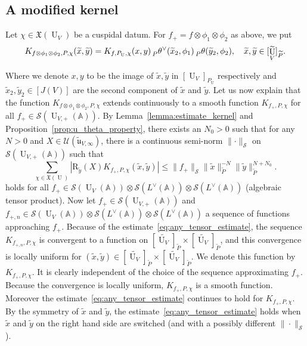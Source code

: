 \documentclass[letterpaper,11pt]{amsart}
\newcommand{\fu}{\mathfrak{u}}
\newcommand{\fX}{\mathfrak{X}}
\newcommand{\bA}{\mathbb{A}}
\newcommand{\cS}{\mathcal{S}}
\newcommand{\cU}{\mathcal{U}}
\newcommand{\<}{\negthickspace}
\providecommand{\aabs}[1]{\lVert#1\rVert}
\providecommand{\Abs}[1]{\left\lvert#1\right\rvert}
\DeclareMathOperator{\U}{U}
\theoremstyle{definition}
\theoremstyle{plain}
\theoremstyle{remark}
\numberwithin{equation}{section}
\begin{document}
\subsection{A modified kernel}

\label{subsec:u_main_thm_spectral}

Let $\chi \in \fX(\U_V)$ be a cuspidal datum. For $f_+=f \otimes
\phi_1 \otimes \phi_2$ as above, we put
\begin{equation}
\label{eq:unitary_kernel_defi}
      K_{f \otimes \phi_1 \otimes \phi_2, P, \chi}
    (\widetilde{x}, \widetilde{y})
    = K_{f, P_{\U}, \chi}(x, y)
    \prescript{}{P}{\theta}^\vee(\widetilde{x}_2, \phi_1)
    \prescript{}{P}{\theta}(\widetilde{y}_2, \phi_2),
    \quad \widetilde{x},\widetilde{y} \in [\widetilde{\U_V}]_{\widetilde{P}}.
\end{equation}

Where we denote $x,y$ to be the image of $\widetilde{x},\widetilde{y}$ in $[\U_V]_{P_{\U}}$ respectively and $\widetilde{x}_2,\widetilde{y}_2 \in [J(V)]$ are the second component of $\widetilde{x}$ and $\widetilde{y}$.
Let us now explain that the function $K_{f \otimes \phi_1 \otimes
\phi_2, P, \chi}$ extends continuously to a smooth function $K_{f_+, P, \chi}$ for
all $f_+ \in \cS(\U_{V, +}(\bA))$. By Lemma~\ref{lemma:estimate_kernel} and
Proposition~\ref{prop:u_theta_property}, there exists an $N_0>0$ such that for
any $N>0$ and $X \in \cU(\widetilde{\fu}_{V,\infty})$, there is a continuous semi-norm $\aabs{\cdot}_\cS$ on $\cS(\U_{V,
+}(\bA))$ such that
    \begin{equation}  \label{eq:any_tensor_estimate}
    \sum_{\chi \in \fX(\U)}
    \Abs{ \mathrm{R}_{\widetilde{y}}(X)K_{f_+,P,\chi}( \widetilde{x},  \widetilde{y})}
    \le \|f_+\|_{\cS} \|  \widetilde{x} \|_{\widetilde{P}}^{-N}
    \aabs{\widetilde{y}}_{\widetilde{P}}^{N+N_0}.
    \end{equation}
holds for all $f_+ \in \cS(\U_V(\bA)) \otimes \cS(L^\vee(\bA)) \otimes
\cS(L^\vee(\bA))$ (algebraic tensor product). Now let $f_+ \in \cS(\U_{V,
+}(\bA))$ and $f_{+, n} \in \cS(\U_V(\bA)) \otimes \cS(L^\vee(\bA)) \otimes
\cS(L^\vee(\bA))$ a sequence of functions approaching $f_+$. Because of the
estimate~\eqref{eq:any_tensor_estimate}, the sequence
$K_{f_{+, n}, P, \chi}$
is convergent to a function on $[\widetilde{\U_V}]_{\widetilde{P}} \times [\widetilde{\U_V}]_{\widetilde{P}}$, and this convergence is locally
uniform for $(\widetilde{x}, \widetilde{y}) \in [\widetilde{\U_V}]_{\widetilde{P}} \times [\widetilde{\U_V}]_{\widetilde{P}}$. We denote this function by $K_{f_+,P,
\chi}$. It is clearly independent of the choice of the sequence approximating
$f_+$. Because the convergence is locally uniform, $K_{f_+, P, \chi}$ is a
smooth function. Moreover the estimate~\eqref{eq:any_tensor_estimate}
continues to hold for $K_{f_+, P, \chi}$. By the symmetry of $\widetilde{x}$
and $\widetilde{y}$, the estimate~\eqref{eq:any_tensor_estimate} holds when
$\widetilde{x}$ and $\widetilde{y}$ on the right hand side are switched (and with a possibly different $\| \cdot \|_\cS$).
\end{document}
